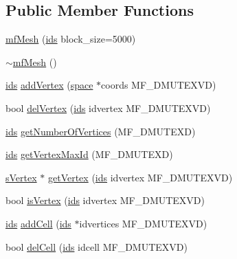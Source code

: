 \subsection*{Public Member Functions}
\begin{DoxyCompactItemize}
\item 
\hyperlink{classmf_1_1mfMesh_a7a36d1e6e6c64894ee2fd032a46f0d24}{mfMesh} (\hyperlink{classmf_1_1mfMesh_a1341cfb4c31ef50c2cb5697b21b4b80e}{ids} block\_\-size=5000)
\item 
\hyperlink{classmf_1_1mfMesh_affbf877509d7ac4783c3f439d6c82f89}{$\sim$mfMesh} ()
\item 
\hyperlink{classmf_1_1mfMesh_a1341cfb4c31ef50c2cb5697b21b4b80e}{ids} \hyperlink{classmf_1_1mfMesh_ae4e2b4f45ce4fac4beeabb82f4710a0a}{addVertex} (\hyperlink{classmf_1_1mfMesh_a6934f60ee28bc351e8a9b4cb0d80c3c9}{space} $\ast$coords MF\_\-DMUTEXVD)
\item 
bool \hyperlink{classmf_1_1mfMesh_a61094919aa1bfdbfe84fbc05c80d3675}{delVertex} (\hyperlink{classmf_1_1mfMesh_a1341cfb4c31ef50c2cb5697b21b4b80e}{ids} idvertex MF\_\-DMUTEXVD)
\item 
\hyperlink{classmf_1_1mfMesh_a1341cfb4c31ef50c2cb5697b21b4b80e}{ids} \hyperlink{classmf_1_1mfMesh_a5c78a2d6b13c0b686d3f850a0daa9632}{getNumberOfVertices} (MF\_\-DMUTEXD)
\item 
\hyperlink{classmf_1_1mfMesh_a1341cfb4c31ef50c2cb5697b21b4b80e}{ids} \hyperlink{classmf_1_1mfMesh_ad8e1e94ffd5bf744c502e2dd032c2905}{getVertexMaxId} (MF\_\-DMUTEXD)
\item 
\hyperlink{classmf_1_1mfMesh_a4035130c7a264094e6a111cada08728a}{sVertex} $\ast$ \hyperlink{classmf_1_1mfMesh_a15917d0f65b9c5986f5fe75f85a8d7ed}{getVertex} (\hyperlink{classmf_1_1mfMesh_a1341cfb4c31ef50c2cb5697b21b4b80e}{ids} idvertex MF\_\-DMUTEXVD)
\item 
bool \hyperlink{classmf_1_1mfMesh_ac36a17d679500fa5a0d2eedf266e6df1}{isVertex} (\hyperlink{classmf_1_1mfMesh_a1341cfb4c31ef50c2cb5697b21b4b80e}{ids} idvertex MF\_\-DMUTEXVD)
\item 
\hyperlink{classmf_1_1mfMesh_a1341cfb4c31ef50c2cb5697b21b4b80e}{ids} \hyperlink{classmf_1_1mfMesh_a1b4a2faff4cd1290f435f428f46f675d}{addCell} (\hyperlink{classmf_1_1mfMesh_a1341cfb4c31ef50c2cb5697b21b4b80e}{ids} $\ast$idvertices MF\_\-DMUTEXVD)
\item 
bool \hyperlink{classmf_1_1mfMesh_a17242594f5b9c2034818ddb6560676d8}{delCell} (\hyperlink{classmf_1_1mfMesh_a1341cfb4c31ef50c2cb5697b21b4b80e}{ids} idcell MF\_\-DMUTEXVD)
\item 

\end{DoxyCompactItemize}
